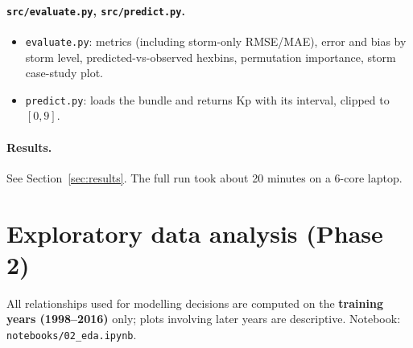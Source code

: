 \documentclass[11pt,a4paper]{article}
\newcommand{\code}[1]{\texttt{#1}}
\begin{document}
\paragraph{\code{src/evaluate.py}, \code{src/predict.py}.}
\begin{itemize}
\item \code{evaluate.py}: metrics (including storm-only RMSE/MAE), error and bias by storm level,
predicted-vs-observed hexbins, permutation importance, storm case-study plot.
\item \code{predict.py}: loads the bundle and returns Kp with its interval, clipped to $[0,9]$.
\end{itemize}

\paragraph{Results.} See Section~\ref{sec:results}. The full run took about 20 minutes on a 6-core laptop.

\section{Exploratory data analysis (Phase 2)}
All relationships used for modelling decisions are computed on the \textbf{training years (1998--2016)} only;
plots involving later years are descriptive. Notebook: \code{notebooks/02\_eda.ipynb}.
\end{document}
